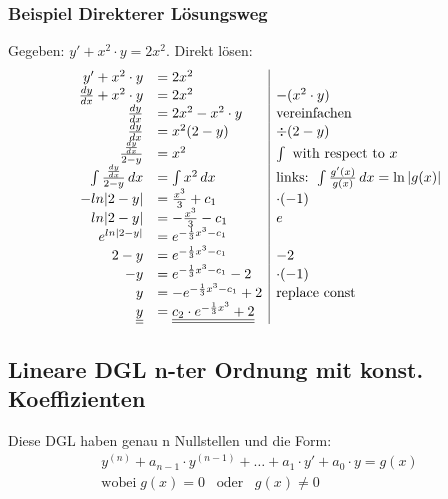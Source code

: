 \subsubsection{Beispiel Direkterer Lösungsweg}
Gegeben: $y' + x^2 \cdot y = 2x^2$.
Direkt lösen:
\begin{equation*}
\begin{array}{r l |l}
y' + x^2 \cdot y &= 2x^2\\
\frac{dy}{dx} + x^2 \cdot y &= 2x^2 \quad & -(x^2 \cdot y)\\
\frac{dy}{dx} &= 2x^2 -x^2 \cdot y \quad & \text{vereinfachen}\\
\frac{dy}{dx} &= x^2 ( 2 - y) \quad & \div (2 - y) \\
\frac{\frac{dy}{dx}}{2 - y} &= x^2  & \int \text{ with respect to } x \\
\int \frac{\frac{dy}{dx}}{2 - y}  \, dx &= \int x^2 \, dx & \text{links: } \int \frac{g'(x)}{g(x)} \, dx = \ln|g(x)|\\ 
- ln |2 - y| &= \frac{x^3}{3} + c_1 & \cdot (-1) \\
ln |2 - y| &= - \frac{x^3}{3} - c_1 & e \\
e^{ln |2 - y|} &= e^{-\frac{1}{3}x^3 - c_1 } \\
2 - y &= e^{-\frac{1}{3}x^3 - c_1 }& - 2 \\
- y &= e^{-\frac{1}{3}x^3 - c_1 } - 2 & \cdot (-1)\\
y &= - e^{-\frac{1}{3}x^3 - c_1 } + 2 & \text{replace const} \\
\underline{\underline{y}} &= \underline{\underline{c_2 \cdot e^{-\frac{1}{3}x^3} + 2}}\\
\end{array} 
\end{equation*}


\subsection{Lineare DGL n-ter Ordnung {\footnotesize mit konst. Koeffizienten}}
Diese DGL haben genau n Nullstellen und die Form:
\begin{eqnarray*}
	y^{(n)}+a_{n-1} \cdot y^{(n-1)}+\ldots+a_1 \cdot y' +a_0 \cdot y=g(x)\\
	\text{wobei} \; g(x) = 0 \hspace{10pt} \text{oder} \hspace{10pt} g(x) \neq 0
\end{eqnarray*}

